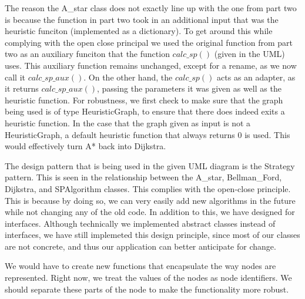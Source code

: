 \documentclass{article}
\begin{document}
The reason the A\_star class does not exactly line up with the one from part two is because the function in part two took in an additional input
that was the heuristic funciton (implemented as a dictionary). To get around this while complying with the open close principal
we used the original function from part two as an auxiliary funciton that the function $calc\_sp()$ (given in the UML) uses. This auxiliary function remains unchanged, except for a rename,
as we now call it $calc\_sp\_aux()$. On the other hand, the $calc\_sp()$ acts as an adapter, as it returns $calc\_sp\_aux()$, passing the parameters it was given as well as the heuristic function.
For robustness, we first check to make sure that the graph being used is of type HeuristicGraph, to ensure that there does indeed exits a heuristic function. 
In the case that the graph given as input is not a HeuristicGraph, a default heuristic function that always returns 0 is used. This would effectively turn A* back into Dijkstra. 

The design pattern that is being used in the given UML diagram is the Strategy pattern. This is seen in the relationship between the
A\_star, Bellman\_Ford, Dijkstra, and SPAlgorithm classes. This complies with the open-close principle. This is because by doing so, 
we can very easily add new algorithms in the future while not changing any of the old code. In addition to this, we have designed for interfaces. Although technically 
we implemented abstract classes instead of interfaces, we have still implemeted this design principle, since most of our classes are not concrete, and thus
our application can better anticipate for change. 

We would have to create new functions that encapsulate the way nodes are represented. Right now, we treat the values of the nodes as node identifiers. We should separate these parts of the node to make the functionality more robust.
\end{document}
